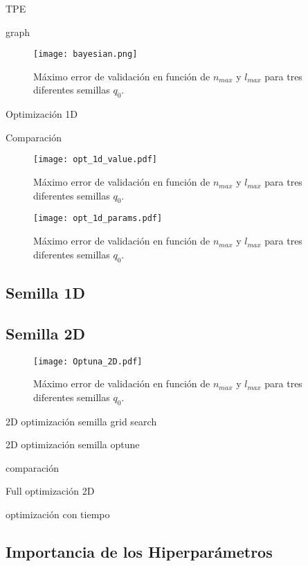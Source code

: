  
 TPE \cite{NIPS2011_86e8f7ab}
 
 graph \cite{Feurer2019}
 
 
\begin{figure}[h!]
\centering
\texttt{[image: bayesian.png]}
\caption{Máximo error de validación en función de $n_{max}$ y $l_{max}$ para tres diferentes semillas $q_0$. \cite{Feurer2019} }
\label{fig:bayesian}
\end{figure}

 Optimización 1D 

 Comparación

\begin{figure}[h!]
\centering
\texttt{[image: opt\_1d\_value.pdf]}
\caption{Máximo error de validación en función de $n_{max}$ y $l_{max}$ para tres diferentes semillas $q_0$. }
\label{fig:optuna_1_value}
\end{figure}

  

\begin{figure}[h!]
\centering
\texttt{[image: opt\_1d\_params.pdf]}
\caption{Máximo error de validación en función de $n_{max}$ y $l_{max}$ para tres diferentes semillas $q_0$. }
\label{fig:optuna_1_params}
\end{figure}



\subsection{Semilla 1D}



\subsection{Semilla 2D}

\begin{figure}[p!]
\centering
\texttt{[image: Optuna\_2D.pdf]}
\caption{Máximo error de validación en función de $n_{max}$ y $l_{max}$ para tres diferentes semillas $q_0$. }
\label{fig:optuna_2d}
\end{figure}

2D optimización semilla grid search

 2D optimización semilla optune

 comparación

 Full optimización 2D

 optimización con tiempo

\subsection{Importancia de los Hiperparámetros}